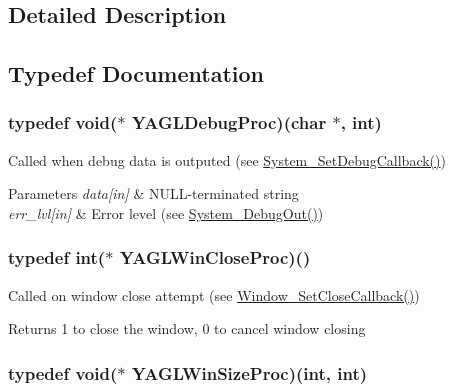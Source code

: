 \subsection{Detailed Description}


\subsection{Typedef Documentation}
\hypertarget{group____callbacks_ga7ae123bcbd5a4a7fb48b73bb9ebd04bc}{
\subsubsection[{Y\-A\-G\-L\-Debug\-Proc}]{\setlength{\rightskip}{0pt plus 5cm}typedef void($\ast$ Y\-A\-G\-L\-Debug\-Proc)(char $\ast$, int)}}\label{group____callbacks_ga7ae123bcbd5a4a7fb48b73bb9ebd04bc}


Called when debug data is outputed (see \hyperlink{group____system_gacf99e83f1f621c84c147e7f99f707cf4}{System\-\_\-\-Set\-Debug\-Callback()}) 


\begin{DoxyParams}{Parameters}
{\em data\mbox{[}in\mbox{]}} & N\-U\-L\-L-\/terminated string \\
\hline
{\em err\-\_\-lvl\mbox{[}in\mbox{]}} & Error level (see \hyperlink{group____system_ga7f28a68bb6c2af19c7004acc26e0cbdb}{System\-\_\-\-Debug\-Out()}) \\
\hline
\end{DoxyParams}
\hypertarget{group____callbacks_ga75b61763676e4aa7c18f0956518bf740}{
\subsubsection[{Y\-A\-G\-L\-Win\-Close\-Proc}]{\setlength{\rightskip}{0pt plus 5cm}typedef int($\ast$ Y\-A\-G\-L\-Win\-Close\-Proc)()}}\label{group____callbacks_ga75b61763676e4aa7c18f0956518bf740}


Called on window close attempt (see \hyperlink{group____window_gabe87127a4dd79764ef3308efe50eb6ea}{Window\-\_\-\-Set\-Close\-Callback()}) 

\begin{DoxyReturn}{Returns}
1 to close the window, 0 to cancel window closing 
\end{DoxyReturn}
\hypertarget{group____callbacks_ga60792a830ce0db49f34dc6b05af814e8}{
\subsubsection[{Y\-A\-G\-L\-Win\-Size\-Proc}]{\setlength{\rightskip}{0pt plus 5cm}typedef void($\ast$ Y\-A\-G\-L\-Win\-Size\-Proc)(int, int)}}\label{group____callbacks_ga60792a830ce0db49f34dc6b05af814e8}


